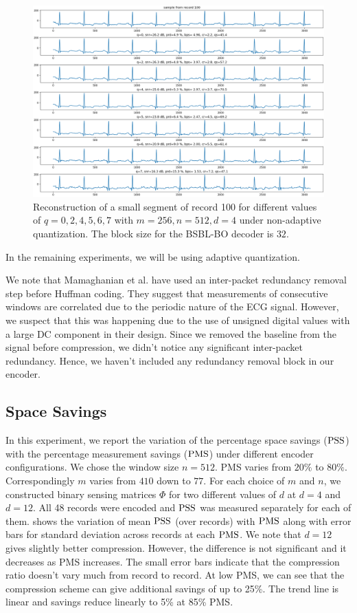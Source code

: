 \begin{figure}
\centering 
\includegraphics[width=0.95\linewidth]
{images/rec_100_q_cr_prd_qs.png}
\caption{Reconstruction of a small segment of record 100
for different values of $q=0,2,4,5,6,7$ with $m=256,n=512,d=4$
under non-adaptive quantization.
The block size for the BSBL-BO decoder is $32$.}
\label{fig:100:q:0-7}
\end{figure}
In the remaining experiments, we will be using adaptive
quantization.

We note that Mamaghanian et al. \cite{mamaghanian2011compressed}
have used an inter-packet redundancy removal step before
Huffman coding. They suggest that measurements of consecutive
windows are correlated due to the periodic nature of the ECG signal.
However, we suspect that this was happening due to the use of
unsigned digital values with a large DC component in their design.
Since we removed the baseline from the signal before compression,
we didn't notice any significant inter-packet redundancy.
Hence, we haven't included any redundancy removal block in our encoder.

\subsection{Space Savings}

In this experiment, we report the variation of
the percentage space savings ($\mathrm{PSS}$)
with the percentage measurement savings ($\mathrm{PMS}$)
under different encoder configurations.
We chose the window size $n=512$.
PMS varies from $20\%$ to $80\%$.
Correspondingly $m$ varies from $410$ down to $77$.
For each choice of $m$ and $n$, we constructed
binary sensing matrices $\Phi$
for two different values of $d$ at $d=4$ and $d=12$.
All 48 records were encoded and $\mathrm{PSS}$ was measured
separately for each of them.
 shows the variation
of mean $\mathrm{PSS}$ (over records) with $\mathrm{PMS}$ along with
error bars for standard deviation across records
at each $\mathrm{PMS}$.
We note that $d=12$ gives slightly better compression.
However, the difference is not significant and it decreases
as PMS increases. The small error bars indicate that the
compression ratio doesn't vary much from record to record.
At low PMS, we can see that the compression scheme can
give additional savings of up to 25\%. The trend line
is linear and savings reduce linearly to 5\% at 85\% PMS.


